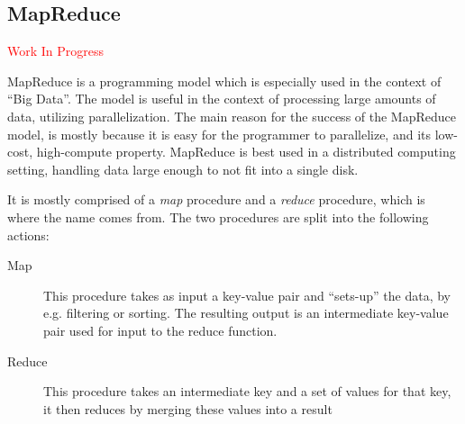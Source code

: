 \subsection{MapReduce} %
\label{sec:mapreduce_programming_model}
\textcolor{red}{Work In Progress}

MapReduce is a programming model which is especially used in the context of ``Big Data''. The model is useful in the context of processing large amounts of data, utilizing parallelization. The main reason for the success of the MapReduce model, is mostly because it is easy for the programmer to parallelize, and its low-cost, high-compute property. MapReduce is best used in a distributed computing setting, handling data large enough to not fit into a single disk.

It is mostly comprised of a \emph{map} procedure and a \emph{reduce} procedure, which is where the name comes from. The two procedures are split into the following actions:


\begin{description}
    \item[Map] This procedure takes as input a key-value pair and ``sets-up'' the data, by e.g. filtering or sorting. The resulting output is an intermediate key-value pair used for input to the reduce function.
    \item[Reduce] This procedure takes an intermediate key and a set of values for that key, it then reduces by merging these values into a result
\end{description}


